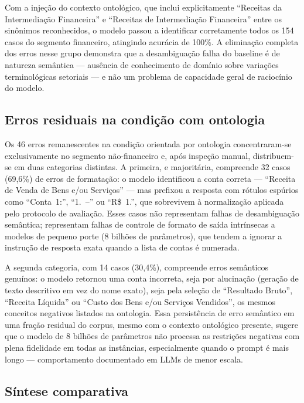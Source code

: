 \documentclass[12pt,a4paper]{article}
\begin{document}
Com a injeção do contexto ontológico, que inclui explicitamente ``Receitas da Intermediação Financeira'' e ``Receitas de Intermediação Financeira'' entre os sinônimos reconhecidos, o modelo passou a identificar corretamente todos os 154 casos do segmento financeiro, atingindo acurácia de 100\%. A eliminação completa dos erros nesse grupo demonstra que a desambiguação falha do baseline é de natureza semântica --- ausência de conhecimento de domínio sobre variações terminológicas setoriais --- e não um problema de capacidade geral de raciocínio do modelo.

\subsection{Erros residuais na condição com ontologia}

Os 46 erros remanescentes na condição orientada por ontologia concentraram-se exclusivamente no segmento não-financeiro e, após inspeção manual, distribuem-se em duas categorias distintas. A primeira, e majoritária, compreende 32 casos (69,6\%) de erros de formatação: o modelo identificou a conta correta --- ``Receita de Venda de Bens e/ou Serviços'' --- mas prefixou a resposta com rótulos espúrios como ``Conta~1:'', ``1.~--'' ou ``R\$~1.'', que sobrevivem à normalização aplicada pelo protocolo de avaliação. Esses casos não representam falhas de desambiguação semântica; representam falhas de controle de formato de saída intrínsecas a modelos de pequeno porte (8 bilhões de parâmetros), que tendem a ignorar a instrução de resposta exata quando a lista de contas é numerada.

A segunda categoria, com 14 casos (30,4\%), compreende erros semânticos genuínos: o modelo retornou uma conta incorreta, seja por alucinação (geração de texto descritivo em vez do nome exato), seja pela seleção de ``Resultado Bruto'', ``Receita Líquida'' ou ``Custo dos Bens e/ou Serviços Vendidos'', os mesmos conceitos negativos listados na ontologia. Essa persistência de erro semântico em uma fração residual do corpus, mesmo com o contexto ontológico presente, sugere que o modelo de 8 bilhões de parâmetros não processa as restrições negativas com plena fidelidade em todas as instâncias, especialmente quando o prompt é mais longo --- comportamento documentado em LLMs de menor escala.

\subsection{Síntese comparativa}
\end{document}
